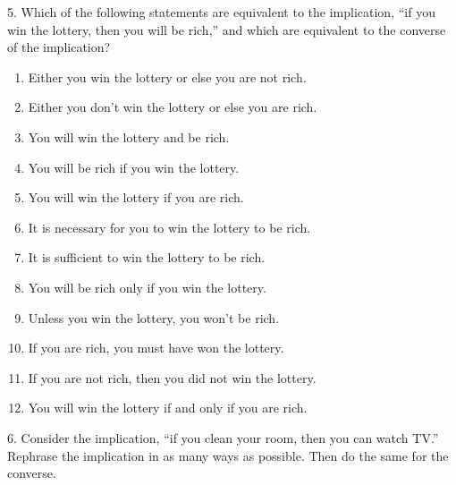\documentclass[10pt,]{book}
\theoremstyle{plain}
\theoremstyle{definition}
\theoremstyle{definition}
\numberwithin{equation}{chapter}
\begin{document}
\begin{exerciselist}
\begin{enumerate}[label=(\alph*)]
\end{enumerate}
\par\smallskip
\item[5.]\hypertarget{exercise-15}{}\hypertarget{p-305}{}%
Which of the following statements are equivalent to the implication, ``if you win the lottery, then you will be rich,'' and which are equivalent to the converse of the implication?%
\leavevmode%
\begin{enumerate}[label=(\alph*)]
\item\hypertarget{li-183}{}\hypertarget{p-306}{}%
Either you win the lottery or else you are not rich.%
\item\hypertarget{li-184}{}\hypertarget{p-307}{}%
Either you don't win the lottery or else you are rich.%
\item\hypertarget{li-185}{}\hypertarget{p-308}{}%
You will win the lottery and be rich.%
\item\hypertarget{li-186}{}\hypertarget{p-309}{}%
You will be rich if you win the lottery.%
\item\hypertarget{li-187}{}\hypertarget{p-310}{}%
You will win the lottery if you are rich.%
\item\hypertarget{li-188}{}\hypertarget{p-311}{}%
It is necessary for you to win the lottery to be rich.%
\item\hypertarget{li-189}{}\hypertarget{p-312}{}%
It is sufficient to win the lottery to be rich.%
\item\hypertarget{li-190}{}\hypertarget{p-313}{}%
You will be rich only if you win the lottery.%
\item\hypertarget{li-191}{}\hypertarget{p-314}{}%
Unless you win the lottery, you won't be rich.%
\item\hypertarget{li-192}{}\hypertarget{p-315}{}%
If you are rich, you must have won the lottery.%
\item\hypertarget{li-193}{}\hypertarget{p-316}{}%
If you are not rich, then you did not win the lottery.%
\item\hypertarget{li-194}{}\hypertarget{p-317}{}%
You will win the lottery if and only if you are rich.%
\end{enumerate}
\par\smallskip
\item[6.]\hypertarget{exercise-16}{}\hypertarget{p-331}{}%
Consider the implication, ``if you clean your room, then you can watch TV.'' Rephrase the implication in as many ways as possible. Then do the same for the converse.%
\par\smallskip
\par\smallskip%

\end{exerciselist}
\end{document}

